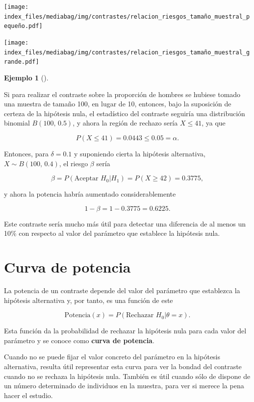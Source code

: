 \documentclass[
  a4paper,
]{scrreport}
\theoremstyle{plain}
\theoremstyle{definition}
\newtheorem{example}{Ejemplo}[chapter]
\theoremstyle{definition}
\theoremstyle{remark}
\begin{document}
\begin{center}
\texttt{[image: index\_files/mediabag/img/contrastes/relacion\_riesgos\_tamaño\_muestral\_pequeño.pdf]}
\end{center}

\begin{center}
\texttt{[image: index\_files/mediabag/img/contrastes/relacion\_riesgos\_tamaño\_muestral\_grande.pdf]}
\end{center}

\begin{example}[]\protect\hypertarget{exm-relacion-riesgos-tamaño-muestral}{}\label{exm-relacion-riesgos-tamaño-muestral}

Si para realizar el contraste sobre la proporción de hombres se hubiese
tomado una muestra de tamaño 100, en lugar de 10, entonces, bajo la
suposición de certeza de la hipótesis nula, el estadístico del contraste
seguiría una distribución binomial \(B(100,\,0.5)\), y ahora la región
de rechazo sería \(X\leq 41\), ya que

\[P(X\leq 41) = 0.0443 \leq 0.05 =\alpha.\]

Entonces, para \(\delta=0.1\) y suponiendo cierta la hipótesis
alternativa, \(X\sim B(100,\,0.4)\), el riesgo \(\beta\) sería

\[\beta = P(\mbox{Aceptar }H_0|H_1) = P(X\geq 42) = 0.3775,\]

y ahora la potencia habría aumentado considerablemente

\[1-\beta = 1-0.3775 = 0.6225.\]

Este contraste sería mucho más útil para detectar una diferencia de al
menos un 10\% con respecto al valor del parámetro que establece la
hipótesis nula.

\end{example}

\section{Curva de potencia}\label{curva-de-potencia}

La potencia de un contraste depende del valor del parámetro que
establezca la hipótesis alternativa y, por tanto, es una función de este

\[\mbox{Potencia}(x)= P(\mbox{Rechazar }H_0|\theta=x).\]

Esta función da la probabilidad de rechazar la hipótesis nula para cada
valor del parámetro y se conoce como \textbf{curva de potencia}.

Cuando no se puede fijar el valor concreto del parámetro en la hipótesis
alternativa, resulta útil representar esta curva para ver la bondad del
contraste cuando no se rechaza la hipótesis nula. También es útil cuando
sólo de dispone de un número determinado de individuos en la muestra,
para ver si merece la pena hacer el estudio.
\end{document}
